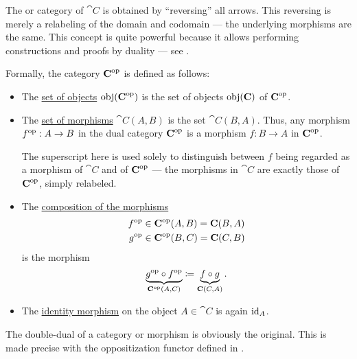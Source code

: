 \begin{definition}\label{def:dual_category}
  The  or  category of \( \cat{C} \) is obtained by \enquote{reversing} all arrows. This reversing is merely a relabeling of the domain and codomain --- the underlying morphisms are the same. This concept is quite powerful because it allows performing constructions and proofs by duality --- see .

  Formally, the category \( \operatorname{\mathbf{C}}^{\operatorname{op}} \) is defined as follows:
  \begin{itemize}
    \item The \hyperref[def:category/objects]{set of objects} \( \operatorname{obj}(\operatorname{\mathbf{C}}^{\operatorname{op}}) \) is the set of objects \( \operatorname{obj}(\operatorname{\mathbf{C}}) \) of \( \operatorname{\mathbf{C}}^{\operatorname{op}} \).

    \item The \hyperref[def:category/morphisms]{set of morphisms} \( \cat{C}(A, B) \) is the set \( \cat{C}(B, A) \). Thus, any morphism \( f^{\operatorname{op}}: A \to B \) in the dual category \( \operatorname{\mathbf{C}}^{\operatorname{op}} \) is a morphism \( f: B \to A \) in \( \operatorname{\mathbf{C}}^{\operatorname{op}} \).

    The superscript here is used solely to distinguish between \( f \) being regarded as a morphism of \( \cat{C} \) and of \( \operatorname{\mathbf{C}}^{\operatorname{op}} \) --- the morphisms in \( \cat{C} \) are exactly those of \( \operatorname{\mathbf{C}}^{\operatorname{op}} \), simply relabeled.

    \item The \hyperref[def:category/composition]{composition of the morphisms}
    \begin{align*}
      f^{\operatorname{op}} &\in \operatorname{\mathbf{C}}^{\operatorname{op}}(A, B) = \operatorname{\mathbf{C}}(B, A) \\
      g^{\operatorname{op}} &\in \operatorname{\mathbf{C}}^{\operatorname{op}}(B, C) = \operatorname{\mathbf{C}}(C, B)
    \end{align*}
    is the morphism
    \begin{equation*}
      \underbrace{g^{\opcat} \bincirc f^{\opcat}}_{\cat{C}^{\opcat}(A, C)} \coloneqq \underbrace{f \bincirc g}_{\cat{C}(C, A)}.
    \end{equation*}

    \item The \hyperref[def:category/identity]{identity morphism} on the object \( A \in \cat{C} \) is again \( \operatorname{id}_A \).
  \end{itemize}
\end{definition}

\begin{remark}\label{rem:double_dual_category}
  The double-dual of a category or morphism is obviously the original. This is made precise with the oppositization functor defined in .
\end{remark}

